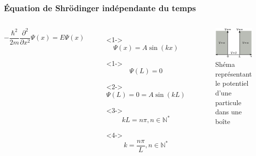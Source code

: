 \documentclass[aspectratio=169]{beamer}
\begin{document}
\begin{frame}
\frametitle{Équation de Shrödinger indépendante du temps}

\begin{columns}

\begin{equation}\tag{4}
-\frac{\hbar^2}{2m}\frac{\partial^2}{\partial x^2}\Psi(x)=E\Psi(x)
\end{equation} 

\begin{itemize}
\item[]<1-> \begin{equation}\tag{5}
\Psi(x)=A\sin(kx)
\end{equation}  
\item[]<1-> \begin{equation}\tag{6}
\Psi(L)=0
\end{equation}
\item[]<2-> \begin{equation}\tag{7}
\Psi(L)=0=A\sin(kL)
\end{equation} 
\item[]<3-> \begin{equation}\tag{8}
kL=n\pi, n\in \mathbb{N}^*
\end{equation} 
\item[]<4-> \begin{equation}\tag{8}
k=\frac{n\pi}{L}, n\in \mathbb{N}^*
\end{equation} 
\end{itemize}
\begin{figure}
\includegraphics[scale=0.4]{Pot}
\caption{Shéma représentant le potentiel d'une particule dans une boîte}
\end{figure}
\end{columns}

\end{frame}
\end{document}
